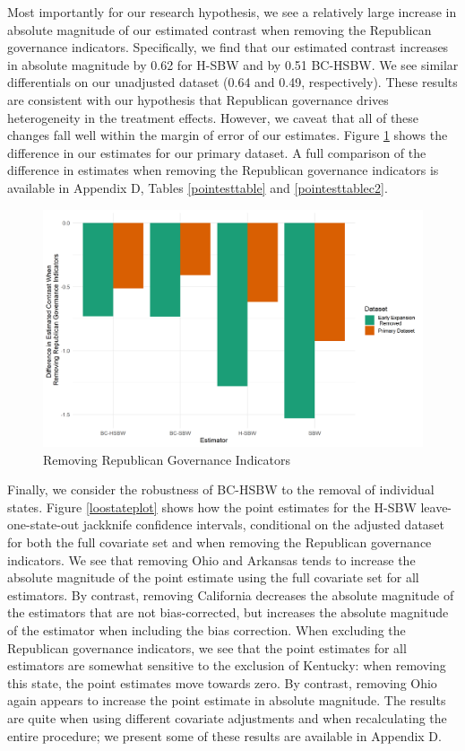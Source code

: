 \documentclass[12pt]{article}
\begin{document}
Most importantly for our research hypothesis, we see a relatively large increase in absolute magnitude of our estimated contrast when removing the Republican governance indicators. Specifically, we find that our estimated contrast increases in absolute magnitude by 0.62 for H-SBW and by 0.51 BC-HSBW. We see similar differentials on our unadjusted dataset (0.64 and 0.49, respectively). These results are consistent with our hypothesis that Republican governance drives heterogeneity in the treatment effects. However, we caveat that all of these changes fall well within the margin of error of our estimates. Figure \ref{repub} shows the difference in our estimates for our primary dataset. A full comparison of the difference in estimates when removing the Republican governance indicators is available in Appendix D, Tables \ref{pointesttable} and \ref{pointesttablec2}.

\begin{figure}[]
\begin{center}
    \includegraphics[scale=0.6]{01_Plots/repub-diff-c1c2.png}
    \caption{Removing Republican Governance Indicators}
    \label{repub}
\end{center}
\end{figure}

Finally, we consider the robustness of BC-HSBW to the removal of individual states. Figure \ref{loostateplot} shows how the point estimates for the H-SBW leave-one-state-out jackknife confidence intervals, conditional on the adjusted dataset for both the full covariate set and when removing the Republican governance indicators. We see that removing Ohio and Arkansas tends to increase the absolute magnitude of the point estimate using the full covariate set for all estimators. By contrast, removing California decreases the absolute magnitude of the estimators that are not bias-corrected, but increases the absolute magnitude of the estimator when including the bias correction. When excluding the Republican governance indicators, we see that the point estimates for all estimators are somewhat sensitive to the exclusion of Kentucky: when removing this state, the point estimates move towards zero. By contrast, removing Ohio again appears to increase the point estimate in absolute magnitude. The results are quite when using different covariate adjustments and when recalculating the entire procedure; we present some of these results are available in Appendix D.
\end{document}
